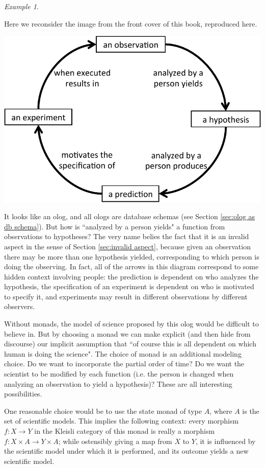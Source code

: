 \documentclass{book}
\def\to{\rightarrow}
\def\taking{\colon}
\theoremstyle{remark}
\newtheorem{example}[subsubsection]{Example}
\theoremstyle{definition}
\begin{document}
\begin{example}\label{ex:scientific method}

Here we reconsider the image from the front cover of this book, reproduced here.
\begin{center}
\includegraphics[width=.8\textwidth]{ScientificMethod}
\end{center}

It looks like an olog, and all ologs are database schemas (see Section \ref{sec:olog as db schema}). But how is ``analyzed by a person yields" a function from observations to hypotheses? The very name belies the fact that it is an invalid aspect in the sense of Section \ref{sec:invalid aspect}, because given an observation there may be more than one hypothesis yielded, corresponding to which person is doing the observing. In fact, all of the arrows in this diagram correspond to some hidden context involving people: the prediction is dependent on who analyzes the hypothesis, the specification of an experiment is dependent on who is motivated to specify it, and experiments may result in different observations by different observers. 

Without monads, the model of science proposed by this olog would be difficult to believe in. But by choosing a monad we can make explicit (and then hide from discourse) our implicit assumption that ``of course this is all dependent on which human is doing the science". The choice of monad is an additional modeling choice. Do we want to incorporate the partial order of time? Do we want the scientist to be modified by each function (i.e. the person is changed when analyzing an observation to yield a hypothesis)? These are all interesting possibilities. 

One reasonable choice would be to use the state monad of type $A$, where $A$ is the set of scientific models. This implies the following context: every morphism $f\taking X\to Y$ in the Kleisli category of this monad is really a morphism $f\taking X\times A\to Y\times A$; while ostensibly giving a map from $X$ to $Y$, it is influenced by the scientific model under which it is performed, and its outcome yields a new scientific model. 


\end{example}
\end{document}

